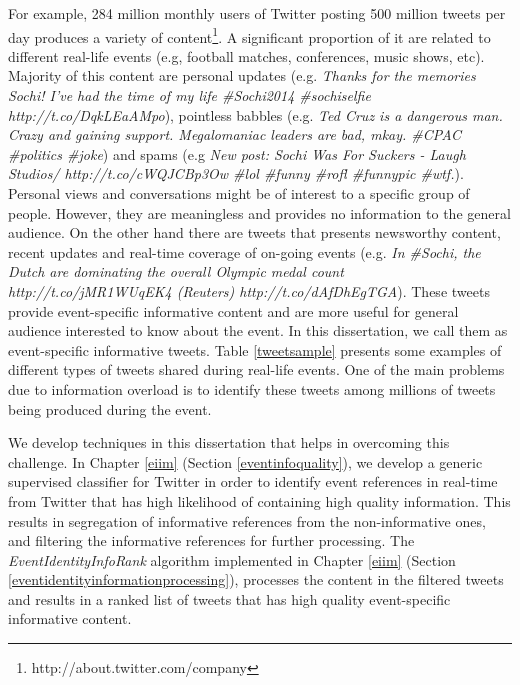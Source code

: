 For example, 284 million monthly users of Twitter posting 500 million tweets per day produces a variety of content\footnote{http://about.twitter.com/company}. A significant proportion of it are related to different real-life events (e.g, football matches, conferences, music shows, etc). Majority of this content are personal updates (e.g.  \textit{Thanks for the memories Sochi! I've had the time of my life \#Sochi2014 \#sochiselfie http://t.co/DqkLEaAMpo}), pointless babbles (e.g. \textit{Ted Cruz is a dangerous man. Crazy and gaining support. Megalomaniac leaders are bad, mkay. \#CPAC \#politics \#joke}) and spams (e.g \textit{New post: Sochi Was For Suckers - Laugh Studios/ http://t.co/cWQJCBp3Ow \#lol \#funny \#rofl \#funnypic \#wtf.}). Personal views and conversations might be of interest to a specific group of people. However, they are meaningless and provides no information to the general audience. On the other hand there are tweets that presents newsworthy content, recent updates and real-time coverage of on-going events (e.g. \textit{In \#Sochi, the Dutch are dominating the overall Olympic medal count http://t.co/jMR1WUqEK4 (Reuters) http://t.co/dAfDhEgTGA}). These tweets provide event-specific informative content and are more useful for general audience interested to know about the event. In this dissertation, we call them as event-specific informative tweets. Table \ref{tweetsample} presents some examples of different types of tweets shared during real-life events. One of the main problems due to information overload is to identify these tweets among millions of tweets being produced during the event.

We develop techniques in this dissertation that helps in overcoming this challenge. In Chapter \ref{eiim} (Section \ref{eventinfoquality}), we develop a generic supervised classifier for Twitter in order to identify event references in real-time from Twitter that has high likelihood of containing high quality information. This results in segregation of informative references from the non-informative ones, and filtering the informative references for further processing. The \textit{EventIdentityInfoRank} algorithm implemented in Chapter \ref{eiim} (Section \ref{eventidentityinformationprocessing}), processes the content in the filtered tweets and results in a ranked list of tweets that has high quality event-specific informative content. 

